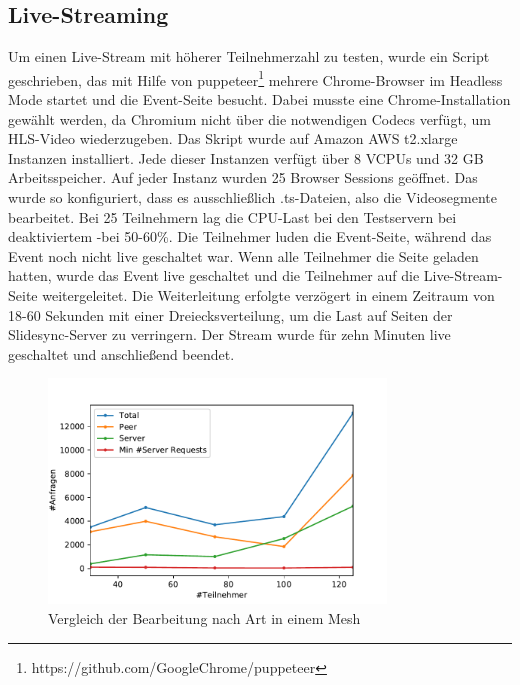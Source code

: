 \subsection{Live-Streaming}
Um einen Live-Stream mit höherer Teilnehmerzahl zu testen, wurde ein Script geschrieben, das mit Hilfe von puppeteer\footnote{https://github.com/GoogleChrome/puppeteer} mehrere Chrome-Browser im Headless Mode startet und die Event-Seite besucht. Dabei musste eine Chrome-Installation gewählt werden, da Chromium nicht über die notwendigen Codecs verfügt, um HLS-Video wiederzugeben. 
Das Skript wurde auf Amazon AWS t2.xlarge Instanzen installiert. Jede dieser Instanzen verfügt über 8 VCPUs und 32 GB Arbeitsspeicher. Auf jeder Instanz wurden 25 Browser Sessions geöffnet.  Das \cdn wurde so konfiguriert, dass es ausschließlich .ts-Dateien, also die Videosegmente bearbeitet. Bei 25 Teilnehmern lag die CPU-Last bei den Testservern bei deaktiviertem \pTp-\cdn bei 50-60\%. 
Die Teilnehmer luden die Event-Seite, während das Event noch nicht live geschaltet war. Wenn alle Teilnehmer die Seite geladen hatten, wurde das Event live geschaltet und die Teilnehmer auf die Live-Stream-Seite weitergeleitet. Die Weiterleitung erfolgte verzögert in einem Zeitraum von 18-60 Sekunden mit einer Dreiecksverteilung, um die Last auf Seiten der Slidesync-Server zu verringern. Der Stream wurde für zehn Minuten live geschaltet und anschließend beendet.

\begin{figure}[!h]
	\centering
	\includegraphics[width=0.8\textwidth]{figures/single_mesh_line}
	\caption[A Figure Short-Title]{Vergleich der Bearbeitung nach Art in einem Mesh}
	\label{fig:single_mesh_line}
\end{figure}

